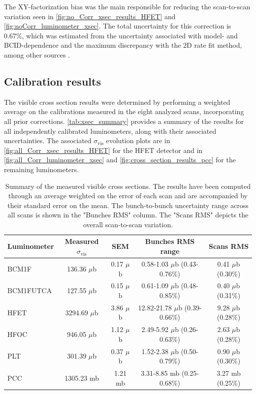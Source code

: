 The XY-factorization bias was the main responsible for reducing the scan-to-scan variation seen in \autoref{fig:no_Corr_xsec_results_HFET} and \autoref{fig:noCorr_luminometer_xsec}. The total uncertainty for this correction is 0.67\%, which was estimated from the uncertainty associated with model- and BCID-dependence and the maximum discrepancy with the 2D rate fit method, among other sources \cite{CMS-PAS-LUM-22-001}.

\subsection{Calibration results}

The visible cross section results were determined by performing a weighted average on the calibrations measured in the eight analyzed scans, incorporating all prior corrections. \autoref{tab:xsec_summary} provides a summary of the results for all independently calibrated luminometers, along with their associated uncertainties. The associated $\sigma_{\mathrm{vis}}$ evolution plots are in \autoref{fig:all_Corr_xsec_results_HFET} for the HFET detector and in \autoref{fig:all_Corr_luminometer_xsec} and \autoref{fig:cross_section_results_pcc} for the remaining luminometers.

\begin{table}[!htb]
	\caption[Summary of visible cross sections results]{Summary of the measured visible cross sections. The results have been computed through an average weighted on the error of each scan and are accompanied by their standard error on the mean. The bunch-to-bunch uncertainty range across all scans is shown in the "Bunches RMS" column. The "Scans RMS" depicts the overall scan-to-scan variation. }
	
	\label{tab:xsec_summary}
	\centering
	\begin{tabular}{lcccc}
		\hline
		Luminometer & Measured $\sigma_\mathrm{vis}$ & SEM  & Bunches RMS range & Scans RMS \\
		\hline
		BCM1F & 136.36 $\mu$b & 0.17 $\mu$b & 0.58-1.03 $\mu$b (0.43-0.76\%) & 0.41 $\mu$b (0.30\%) \\
		BCM1FUTCA & 127.55 $\mu$b & 0.15 $\mu$b & 0.61-1.09 $\mu$b (0.48-0.85\%) & 0.40 $\mu$b (0.31\%) \\
		HFET & 3294.69 $\mu$b & 3.86 $\mu$b & 12.82-21.78 $\mu$b (0.39-0.66\%) & 9.28 $\mu$b (0.28\%) \\
		HFOC & 946.05 $\mu$b & 1.12 $\mu$b & 2.49-5.92 $\mu$b (0.26-0.63\%) & 2.63 $\mu$b (0.28\%) \\
		PLT & 301.39 $\mu$b & 0.37 $\mu$b & 1.52-2.38 $\mu$b (0.50-0.79\%) & 0.90 $\mu$b (0.30\%) \\
		PCC & 1305.23 mb & 1.21 mb & 3.31-8.85 mb (0.25-0.68\%) & 3.27 mb (0.25\%) \\
		\hline
	\end{tabular}
\end{table}

